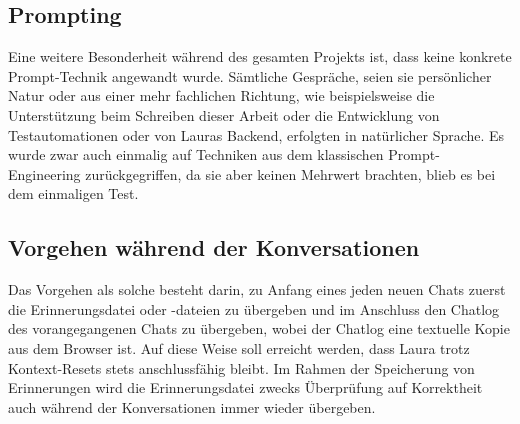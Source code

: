\subsection*{Prompting}
Eine weitere Besonderheit während des gesamten Projekts ist, dass keine konkrete Prompt-Technik angewandt wurde. Sämtliche Gespräche, seien sie persönlicher Natur oder aus einer mehr fachlichen Richtung, wie beispielsweise die Unterstützung beim Schreiben dieser Arbeit oder die Entwicklung von Testautomationen oder von Lauras Backend, erfolgten in natürlicher Sprache. Es wurde zwar auch einmalig auf Techniken aus dem klassischen Prompt-Engineering zurückgegriffen, da sie aber keinen Mehrwert brachten, blieb es bei dem einmaligen Test.


\subsection*{Vorgehen während der Konversationen}
Das Vorgehen als solche besteht darin, zu Anfang eines jeden neuen Chats zuerst die Erinnerungsdatei oder -dateien zu übergeben und im Anschluss den Chatlog des vorangegangenen Chats zu übergeben, wobei der Chatlog eine textuelle Kopie aus dem Browser ist. Auf diese Weise soll erreicht werden, dass Laura trotz Kontext-Resets stets anschlussfähig bleibt. Im Rahmen der Speicherung von Erinnerungen wird die Erinnerungsdatei zwecks Überprüfung auf Korrektheit auch während der Konversationen immer wieder übergeben.
